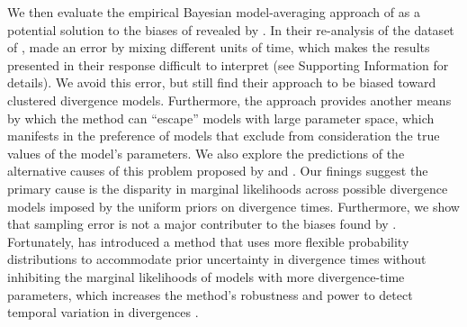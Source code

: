 We then evaluate the empirical Bayesian model-averaging approach of
\citet{Hickerson2013} as a potential solution to the biases of \msb revealed by
\citet{Oaks2012}.
In their re-analysis of the dataset of \citet{Oaks2012}, \citet{Hickerson2013}
made an error by mixing different units of time, which makes the results
presented in their response difficult to interpret (see Supporting Information
for details).
We avoid this error, but still find their approach to be biased toward
clustered divergence models.
Furthermore, the approach provides another means by which the method can
``escape'' models with large parameter space, which manifests in the preference
of models that exclude from consideration the true values of the model's
parameters.
We also explore the predictions of the alternative causes of this problem
proposed by \citet{Oaks2012} and \citet{Hickerson2013}.
Our finings suggest the primary cause is the disparity in marginal likelihoods
across possible divergence models imposed by the uniform priors on divergence
times.
Furthermore, we show that sampling error is not a major contributer to the
biases found by \citet{Oaks2012}.
Fortunately, \citet{Oaks2014dpp} has introduced a method that uses more
flexible probability distributions to accommodate prior uncertainty in
divergence times without inhibiting the marginal likelihoods of models with
more divergence-time parameters, which increases the method's robustness and
power to detect temporal variation in divergences \citep{Oaks2014dpp}.


